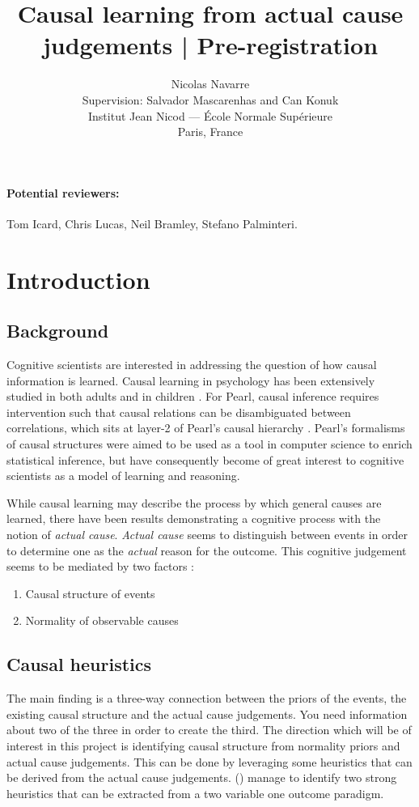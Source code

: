 \documentclass[10pt,letterpaper]{article}
\title{Causal learning from actual cause judgements | Pre-registration}
\author{{\large Nicolas Navarre }\\
{Supervision: Salvador Mascarenhas and Can Konuk}\\ 
{Institut Jean Nicod --- École Normale Supérieure}\\
{Paris, France}\\
}
\begin{document}
\maketitle

\paragraph{Potential reviewers:} Tom Icard, Chris Lucas, Neil Bramley, Stefano Palminteri.

\section*{Introduction}

\subsection*{Background}

Cognitive scientists are interested in addressing the question of how causal information is learned.
Causal learning in psychology has been extensively studied in both adults and in children \citep{Gopnik2004,Gopnik2007}. 
For Pearl, causal inference requires intervention such that causal relations
can be disambiguated between correlations, which sits at layer-2 of Pearl's
causal hierarchy \citep{reasonPearl09a}. 
Pearl's formalisms of causal structures were aimed to be used as a tool in computer science to enrich statistical inference, but have consequently become of great interest to cognitive scientists as a model of learning and reasoning.

While causal learning may describe the process by which general causes are learned, there have been results demonstrating a cognitive process with the notion of \textit{actual cause}. \textit{Actual cause} seems to distinguish between events in order to determine one as the \textit{actual} reason for the outcome. This cognitive judgement seems to be mediated by two factors \citep{ICARD201780}:

\begin{enumerate}
  \item Causal structure of events
  \item Normality of observable causes
\end{enumerate}

\subsection*{Causal heuristics}
The main finding is a three-way connection between the priors of the events, the existing causal structure and the actual cause judgements. You need information about two of the three in order to create the third.
The direction which will be of interest in this project is identifying causal structure from normality priors and actual cause judgements. This can be done by leveraging some heuristics that can be derived from the actual cause judgements. \citeauthor{ICARD201780} (\citeyear{ICARD201780}) manage to identify two strong heuristics that can be extracted from a two variable one outcome paradigm.
\end{document}
